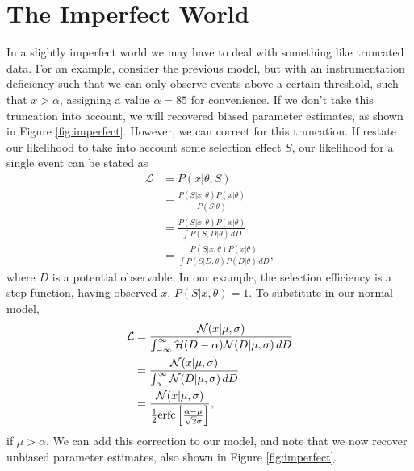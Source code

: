 \documentclass[a4paper,fleqn,usenatbib]{mnras}
\begin{document}
\section{The Imperfect World}
\label{sec:imperfect}
In a slightly imperfect world we may have to deal with something like truncated data. For an example, consider the previous model, but with an instrumentation deficiency such that we can only observe events above a certain threshold, such that $x > \alpha$, assigning a value $\alpha=85$ for convenience. If we don't take this truncation into account, we will recovered biased parameter estimates, as shown in Figure \ref{fig:imperfect}. However, we can correct for this truncation. If restate our likelihood to take into account some selection effect $S$, our likelihood for a single event can be stated as
\begin{align}
\mathcal{L} &= P(x | \theta, S)\\
&= \frac{P(S|x,\theta) P(x|\theta)}{P(S|\theta)} \\
&= \frac{P(S|x,\theta) P(x|\theta)}{\int P(S, D|\theta)\, dD} \\
&= \frac{P(S|x,\theta) P(x|\theta)}{\int P(S | D, \theta) P(D|\theta)\, dD},
\end{align}
where $D$ is a potential observable. In our example, the selection efficiency is a step function, having observed $x$, $P(S|x,\theta) = 1$. To substitute in our normal model,
\begin{align}
\mathcal{L} &= \frac{ \mathcal{N}(x|\mu, \sigma)}{\int_{-\infty}^\infty \mathcal{H}(D - \alpha) \mathcal{N}(D|\mu, \sigma)\, dD} \\
&= \frac{ \mathcal{N}(x|\mu, \sigma)}{\int_{\alpha}^\infty \mathcal{N}(D|\mu, \sigma)\, dD} \\
&= \frac{ \mathcal{N}(x|\mu, \sigma)}{\frac{1}{2} {\rm erfc}\left[ \frac{\alpha - \mu}{\sqrt{2}\sigma} \right]}, 
\end{align}
if $\mu > \alpha$. We can add this correction to our model, and note that we now recover unbiased parameter estimates, also shown in Figure \ref{fig:imperfect}.
\end{document}
